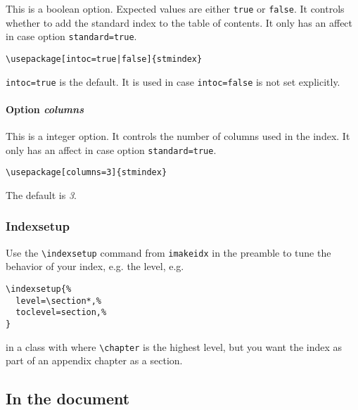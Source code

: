 \documentclass{scrartcl}
\begin{document}
This is a boolean option. Expected values are either \texttt{true} or \texttt{false}. It controls whether to add the standard index to the table of contents. It only has an affect in case option \texttt{standard=true}.

\begin{verbatim}
\usepackage[intoc=true|false]{stmindex}
\end{verbatim}

\texttt{intoc=true} is the default. It is used in case \texttt{intoc=false} is not set explicitly.

\paragraph{Option \protect\textit{columns}} 
\label{sec:usage:preamble:options:columns}

This is a integer option. It controls the number of columns used in the index.  It only has an affect in case option \texttt{standard=true}.

\begin{verbatim}
\usepackage[columns=3]{stmindex}
\end{verbatim}

The default is \textit{3}.

\subsubsection{Indexsetup}

Use the \verb+\indexsetup+ command from \texttt{imakeidx} in the preamble to tune the behavior of your index, e.g. the level, e.g.

\begin{verbatim}
\indexsetup{%
  level=\section*,%
  toclevel=section,%
}
\end{verbatim}

in a class with where \verb+\chapter+ is the highest level, but you want the index as part of an appendix chapter as a section.

\subsection{In the document}
\end{document}
